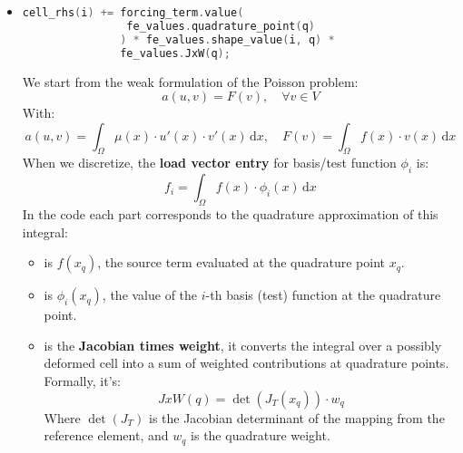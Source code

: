 \begin{itemize}
    \item {}
    \begin{lstlisting}[language=C++]
cell_rhs(i) += forcing_term.value(
                fe_values.quadrature_point(q)
               ) * fe_values.shape_value(i, q) *
               fe_values.JxW(q);\end{lstlisting}
    We start from the weak formulation of the Poisson problem:
    \begin{equation*}
        a(u, v) = F(v), \quad \forall v \in V
    \end{equation*}
    With:
    \begin{equation*}
        a(u,v) = \int_{\Omega} \mu(x) \cdot u'(x) \cdot v'(x)\, \mathrm{d}x, 
        \quad
        F(v) = \int_{\Omega} f(x) \cdot v(x)\, \mathrm{d}x 
    \end{equation*}
    When we discretize, the \textbf{load vector entry} for basis/test function $\phi_{i}$ is:
    \begin{equation*}
        f_{i} = \int_{\Omega} f(x) \cdot \phi_i(x)\, \mathrm{d}x
    \end{equation*}
    In the code each part corresponds to the quadrature approximation of this integral:
    \begin{itemize}
        \item {} is $f(x_{q})$, the source term evaluated at the quadrature point $x_{q}$.
        
        \item {} is $\phi_{i}(x_{q})$, the value of the $i$-th basis (test) function at the quadrature point.
        
        \item {} is the \textbf{Jacobian times weight}, it converts the integral over a possibly deformed cell into a sum of weighted contributions at quadrature points. Formally, it's:
        \begin{equation*}
            JxW(q) = \det\left(J_T\left(x_q\right)\right) \cdot w_q
        \end{equation*}
        Where $\det(J_{T})$ is the Jacobian determinant of the mapping from the reference element, and $w_{q}$ is the quadrature weight.


\end{itemize}
\end{itemize}

